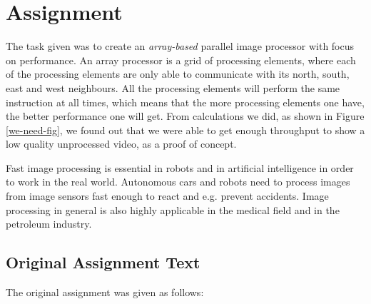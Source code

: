 \section{Assignment}
The task given was to create an {\em array-based} parallel image processor with
focus on performance. An array processor is a grid of processing elements, where
each of the processing elements are only able to communicate with its north,
south, east and west neighbours. All the processing elements will perform the
same instruction at all times, which means that the more processing elements one
have, the better performance one will get. From calculations we did, as shown in
Figure \ref{we-need-fig}, we found out that we were able to get enough
throughput to show a low quality unprocessed video, as a proof of concept.

Fast image processing is essential in robots\cite{miller1989r-vision,
  thrun2007stanley} and in artificial intelligence\cite{hwang1989parallel} in
order to work in the real world. Autonomous cars and robots need to process
images from image sensors fast enough to react and e.g. prevent
accidents\cite{aufrere2003coll-avoid}. Image processing in general is also
highly applicable in the medical field\cite{luong2009medical-image,
  sternberg1983biomedical} and in the petroleum
industry\cite{ferrari2007steam-images}.

\subsection{Original Assignment Text}

The original assignment was given as follows:

